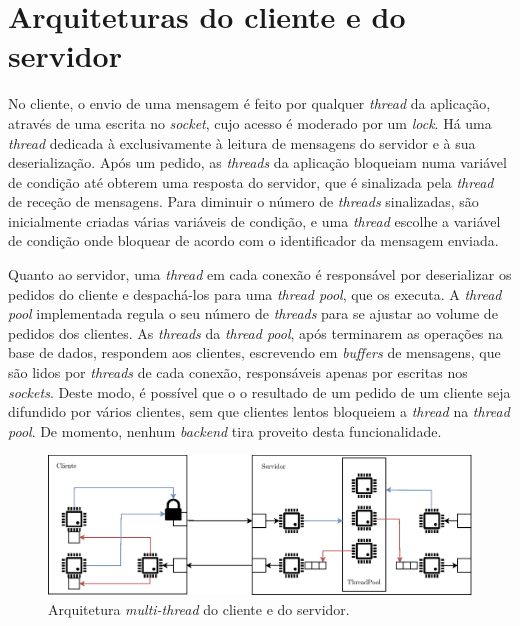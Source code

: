 \documentclass[11pt, a4paper]{article}
\begin{document}
\section{Arquiteturas do cliente e do servidor}

No cliente, o envio de uma mensagem é feito por qualquer \emph{thread} da aplicação, através de uma
escrita no \emph{socket}, cujo acesso é moderado por um \emph{lock}. Há uma \emph{thread} dedicada à
exclusivamente à leitura de mensagens do servidor e à sua deserialização. Após um pedido, as
\emph{threads} da aplicação bloqueiam numa variável de condição até obterem uma resposta do
servidor, que é sinalizada pela \emph{thread} de receção de mensagens. Para diminuir o número de
\emph{threads} sinalizadas, são inicialmente criadas várias variáveis de condição, e uma
\emph{thread} escolhe a variável de condição onde bloquear de acordo com o identificador da mensagem
enviada.

Quanto ao servidor, uma \emph{thread} em cada conexão é responsável por deserializar os pedidos do
cliente e despachá-los para uma \emph{thread pool}, que os executa. A \emph{thread pool}
implementada regula o seu número de \emph{threads} para se ajustar ao volume de pedidos dos
clientes. As \emph{threads} da \emph{thread pool}, após terminarem as operações na base de dados,
respondem aos clientes, escrevendo em \emph{buffers} de mensagens, que são lidos por \emph{threads}
de cada conexão, responsáveis apenas por escritas nos \emph{sockets}. Deste modo, é possível que o o
resultado de um pedido de um cliente seja difundido por vários clientes, sem que clientes lentos
bloqueiem a \emph{thread} na \emph{thread pool}. De momento, nenhum \emph{backend} tira proveito
desta funcionalidade.

\begin{figure}[H]
    \centering
    \includegraphics[width=\textwidth]{res/ClientServer.eps}
    \caption{Arquitetura \emph{multi-thread} do cliente e do servidor.}
    \label{client-server-architecture}
\end{figure}
\end{document}
